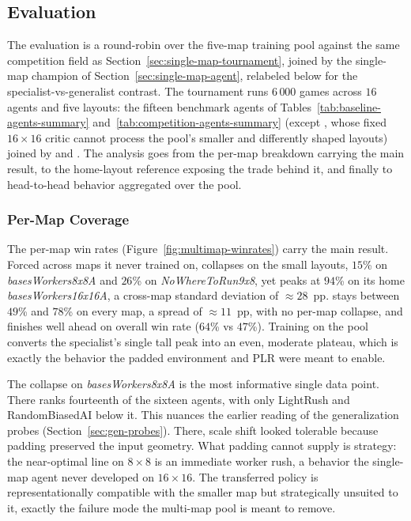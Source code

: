 \vspace{-0.15cm}

\subsection{Evaluation}
\label{subsec:multimap-eval}

The evaluation is a round-robin over the five-map training pool against the same competition field as Section~\ref{sec:single-map-tournament}, joined by the single-map champion  of Section~\ref{sec:single-map-agent}, relabeled  below for the specialist-vs-generalist contrast. The tournament runs $6\,000$ games across $16$ agents and five layouts: the fifteen benchmark agents of Tables~\ref{tab:baseline-agents-summary} and~\ref{tab:competition-agents-summary} (except , whose fixed $16{\times}16$ critic cannot process the pool's smaller and differently shaped layouts) joined by  and . The analysis goes from the per-map breakdown carrying the main result, to the home-layout reference exposing the trade behind it, and finally to head-to-head behavior aggregated over the pool.

\vspace{-0.2cm}

\subsubsection{Per-Map Coverage}
\label{subsec:multimap-per-map}

The per-map win rates (Figure~\ref{fig:multimap-winrates}) carry the main result. Forced across maps it never trained on,  collapses on the small layouts, $15$\% on \emph{basesWorkers8x8A} and $26$\% on \emph{NoWhereToRun9x8}, yet peaks at $94$\% on its home \emph{basesWorkers16x16A}, a cross-map standard deviation of ${\approx}28$~pp.  stays between $49$\% and $78$\% on every map, a spread of ${\approx}11$~pp, with no per-map collapse, and finishes well ahead on overall win rate ($64$\% vs $47$\%). Training on the pool converts the specialist's single tall peak into an even, moderate plateau, which is exactly the behavior the padded environment and PLR were meant to enable.

The collapse on \emph{basesWorkers8x8A} is the most informative single data point. There  ranks fourteenth of the sixteen agents, with only LightRush and RandomBiasedAI below it. This nuances the earlier reading of the generalization probes (Section~\ref{sec:gen-probes}). There, scale shift looked tolerable because padding preserved the input geometry. What padding cannot supply is strategy: the near-optimal line on $8{\times}8$ is an immediate worker rush, a behavior the single-map agent never developed on $16{\times}16$. The transferred policy is representationally compatible with the smaller map but strategically unsuited to it, exactly the failure mode the multi-map pool is meant to remove.

